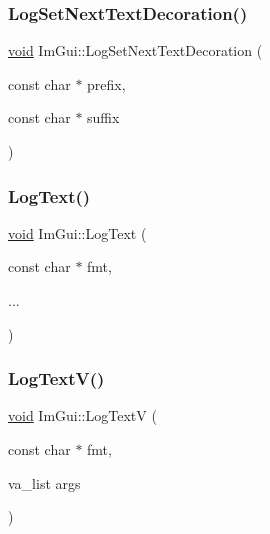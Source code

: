 \mbox{\label{namespaceImGui_a66bc1e61bff5f2170bcd2d7d071eaa22}} 
\subsubsection{\texorpdfstring{Log\+Set\+Next\+Text\+Decoration()}{LogSetNextTextDecoration()}}
{\footnotesize\ttfamily \hyperlink{imgui__impl__opengl3__loader_8h_ac668e7cffd9e2e9cfee428b9b2f34fa7}{void} Im\+Gui\+::\+Log\+Set\+Next\+Text\+Decoration (\begin{DoxyParamCaption}\item[{const char $\ast$}]{prefix,  }\item[{const char $\ast$}]{suffix }\end{DoxyParamCaption})}

\mbox{\label{namespaceImGui_aa548475d8f771ab6524d73d900a41198}} 
\subsubsection{\texorpdfstring{Log\+Text()}{LogText()}}
{\footnotesize\ttfamily \hyperlink{imgui__impl__opengl3__loader_8h_ac668e7cffd9e2e9cfee428b9b2f34fa7}{void} Im\+Gui\+::\+Log\+Text (\begin{DoxyParamCaption}\item[{const char $\ast$}]{fmt,  }\item[{}]{... }\end{DoxyParamCaption})}

\mbox{\label{namespaceImGui_a98df9ecc95235a208c834945c71df3a0}} 
\subsubsection{\texorpdfstring{Log\+Text\+V()}{LogTextV()}}
{\footnotesize\ttfamily \hyperlink{imgui__impl__opengl3__loader_8h_ac668e7cffd9e2e9cfee428b9b2f34fa7}{void} Im\+Gui\+::\+Log\+TextV (\begin{DoxyParamCaption}\item[{const char $\ast$}]{fmt,  }\item[{va\+\_\+list}]{args }\end{DoxyParamCaption})}

